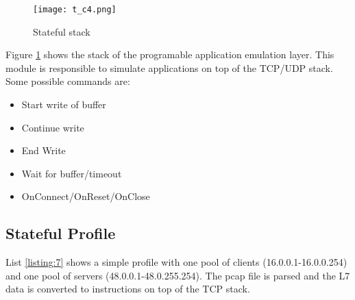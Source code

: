 \documentclass[conference]{IEEEtran}
\begin{document}
\begin{figure}[h]
  \texttt{[image: t\_c4.png]}
  \caption{Stateful stack}
  \label{fig:astf_stack}
\end{figure}

Figure \ref{fig:astf_stack} shows the stack of the programable application emulation layer. This module is responsible to simulate applications on top of the TCP/UDP stack. 
Some possible commands are:

\begin{itemize}
  \item Start write of buffer
  \item Continue write
  \item End Write
  \item Wait for buffer/timeout
  \item OnConnect/OnReset/OnClose
\end{itemize}


\subsection{ Stateful Profile }


List \ref{listing:7} shows a simple profile with one pool of clients (16.0.0.1-16.0.0.254) and one pool of servers (48.0.0.1-48.0.255.254). 
The pcap file is parsed and the L7 data is converted to instructions on top of the TCP stack.
\end{document}
